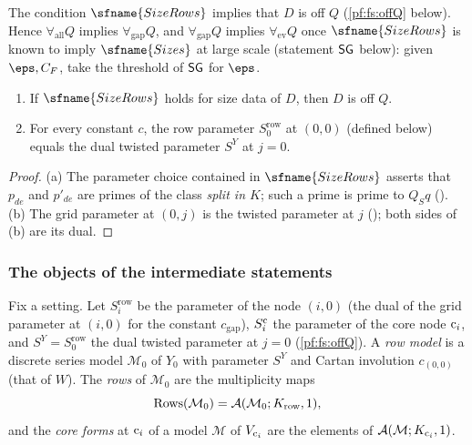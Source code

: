 The condition $\sfname{SizeRows}$ implies that $D$ is off $Q$ (\cref{pf:fs:offQ} below). Hence $\forall_{\mathrm{all}}Q$ implies
$\forall_{\mathrm{gap}}Q$, and $\forall_{\mathrm{gap}}Q$ implies $\forall_{\mathrm{ev}}Q$ once $\sfname{SizeRows}$ is known to imply
$\sfname{Sizes}$ at large scale (statement $\mathsf{SG}$ below): given $\eps,C_F$, take the threshold of $\mathsf{SG}$ for $\eps$.

\begin{lemma}\label{pf:fs:offQ}
\begin{enumerate}[label=(\alph*)]
\item If $\sfname{SizeRows}$ holds for size data of $D$, then $D$ is off $Q$.
\item For every constant $c$, the row parameter $S^{\mathrm{row}}_0$ at $(0,0)$ (defined below) equals the dual twisted
parameter $S^Y$ at $j=0$.
\end{enumerate}
\end{lemma}

\begin{proof}
(a) The parameter choice contained in $\sfname{SizeRows}$ asserts that $p_{de}$ and $p'_{de}$ are primes of the class
\emph{split in $K$}; such a prime is prime to $Q_Sq$ (). (b) The grid
parameter at $(0,j)$ is the twisted parameter at $j$ (); both sides of (b) are its
dual.
\end{proof}

\subsubsection{The objects of the intermediate statements}

Fix a setting. Let $S^{\mathrm{row}}_i$ be the parameter of the node $(i,0)$ (the dual of the grid parameter at $(i,0)$ for the
constant $c_{\mathrm{gap}}$), $S^{\mathrm{c}}_i$ the parameter of the core node $\mathrm{c}_i$, and $S^Y=S^{\mathrm{row}}_0$ the dual twisted
parameter at $j=0$ (\cref{pf:fs:offQ}). A \emph{row model} is a discrete series model $\mathcal M_0$ of
$Y_0$ with parameter $S^Y$ and Cartan involution $c_{(0,0)}$ (that of $W$). The \emph{rows} of $\mathcal M_0$ are the multiplicity
maps
\[
\mathrm{Rows}(\mathcal M_0)=\mathcal A(\mathcal M_0;K_{\mathrm{row}},1),
\]
and the \emph{core forms} at $\mathrm{c}_i$ of a model $\mathcal M$ of $V_{\mathrm{c}_i}$ are the elements of $\mathcal A(\mathcal M;K_{\mathrm{c}_i},1)$.

